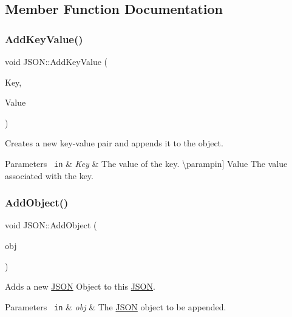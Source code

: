 \subsection{Member Function Documentation}
\mbox{\label{class_j_s_o_n_a71082e876f9e7b1509a32b8a2f3796bd}} 
\subsubsection{\texorpdfstring{AddKeyValue()}{AddKeyValue()}}
{\footnotesize\ttfamily void J\+S\+O\+N\+::\+Add\+Key\+Value (\begin{DoxyParamCaption}\item[{std\+::string}]{Key,  }\item[{std\+::string}]{Value }\end{DoxyParamCaption})}

Creates a new key-\/value pair and appends it to the object. 
\begin{DoxyParams}[1]{Parameters}
\mbox{\texttt{ in}}  & {\em Key} & The value of the key. \textbackslash{}parampin\mbox{]} Value The value associated with the key. \\
\hline
\end{DoxyParams}
\mbox{\label{class_j_s_o_n_a11a970ad576819bfdc48837d42e1f500}} 
\subsubsection{\texorpdfstring{AddObject()}{AddObject()}\hspace{0.1cm}{\footnotesize\ttfamily [1/2]}}
{\footnotesize\ttfamily void J\+S\+O\+N\+::\+Add\+Object (\begin{DoxyParamCaption}\item[{\mbox{\hyperlink{class_j_s_o_n}{J\+S\+ON}}}]{obj }\end{DoxyParamCaption})}

Adds a new \mbox{\hyperlink{class_j_s_o_n}{J\+S\+ON}} Object to this \mbox{\hyperlink{class_j_s_o_n}{J\+S\+ON}}. 
\begin{DoxyParams}[1]{Parameters}
\mbox{\texttt{ in}}  & {\em obj} & The \mbox{\hyperlink{class_j_s_o_n}{J\+S\+ON}} object to be appended. \\
\hline
\end{DoxyParams}
\mbox{\label{class_j_s_o_n_a28f1459b643749650cea8a20355a5038}} 
